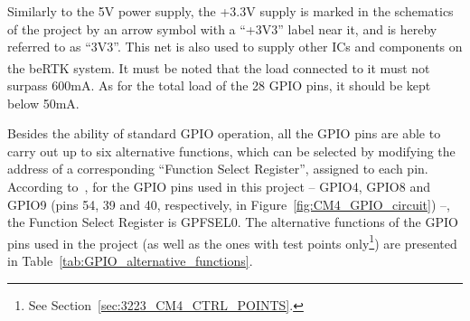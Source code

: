 Similarly to the 5V power supply, the +3.3V supply is marked in the schematics of the project by an arrow symbol with a ``+3V3'' label near it, and is hereby referred to as ``3V3''. This net is also used to supply other ICs and components on the beRTK\textsuperscript{\textregistered} system. It must be noted that the load connected to it must not surpass 600mA. As for the total load of the 28 GPIO pins, it should be kept below 50mA.

Besides the ability of standard GPIO operation, all the GPIO pins are able to carry out up to six alternative functions, which can be selected by modifying the address of a corresponding ``Function Select Register'', assigned to each pin. According to~\cite{BCM2711}, for the GPIO pins used in this project -- GPIO4, GPIO8 and GPIO9 (pins 54, 39 and 40, respectively, in Figure~\ref{fig:CM4_GPIO_circuit}) --, the Function Select Register is GPFSEL0. The alternative functions of the GPIO pins used in the project (as well as the ones with test points only\footnote[15]{See Section~\ref{sec:3223_CM4_CTRL_POINTS}.}) are presented in Table~\ref{tab:GPIO_alternative_functions}.

\begingroup
\begin{table}[h]
	\caption{Alternative function assignment of the GPIO pins used in the project (adapted from~\cite{CM4}).}
	\label{tab:GPIO_alternative_functions}
	\centering
\end{table}
\endgroup

